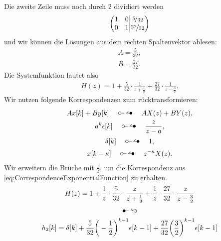 \documentclass[11pt,a4paper,DIV=12]{scrartcl}
\begin{document}
Die zweite Zeile muss noch durch $2$ dividiert werden
\begin{gather}
	\left\lparen\begin{matrix}
		1 & 0 \\
		0&1
	\end{matrix}
	\middle\vert
	\begin{matrix}
		\nicefrac{5}{32} \\
		\nicefrac{27}{32}
	\end{matrix}\right\rparen
\end{gather}
und wir können die Lösungen aus dem rechten Spaltenvektor ablesen:
\begin{gather}
	A=\frac{5}{32},\\
	B=\frac{27}{32}.
\end{gather}
Die Systemfunktion lautet also
\begin{gather}
	H(z)=1+\frac{5}{32}\cdot\frac{1}{z+\frac{1}{2}}+\frac{27}{32}\cdot\frac{1}{z-\frac{3}{2}}.
\end{gather}
Wir nutzen folgende Korrespondenzen zum rücktransformieren:
\begin{gather}
	Ax[k]+By[k]\quad \ztransf\quad AX(z)+BY(z),\\
	\label{eq:CorrespondenceExponentialFunction}
	a^k\epsilon[k]\quad\ztransf\quad \frac{z}{z-a},\\
	\delta[k]\quad\ztransf\quad 1,\\
	x[k-\kappa]\quad\ztransf\quad z^{-\kappa}X(z).
\end{gather}
Wir erweitern die Brüche mit $\frac{z}{z}$, um die Korrespondenz aus \eqref{eq:CorrespondenceExponentialFunction} zu erhalten.
\begin{gather}
	H(z)=1+ \frac{1}{z}\cdot\frac{5}{32}\cdot\frac{z}{z+\frac{1}{2}}+\frac{1}{z}\cdot\frac{27}{32}\cdot\frac{z}{z-\frac{3}{2}}\nonumber\\
	\Ztransf\nonumber\\
	h_2[k]=\delta[k]+\frac{5}{32}\bigg (-\frac{1}{2}\bigg )^{k-1}\epsilon[k-1]+\frac{27}{32}\bigg (\frac{3}{2}\bigg )^{k-1}\epsilon[k-1]\nonumber
\end{gather}
\newpage
\end{document}
